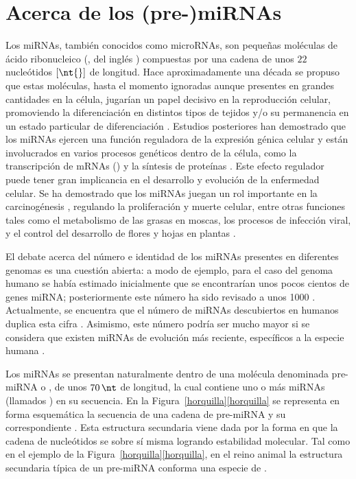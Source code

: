 %
%
%
\section{Acerca de los (pre-)miRNAs}
%
Los miRNAs, también conocidos como microRNAs, son pequeñas moléculas
de ácido ribonucleico (, del inglés )
compuestas por una cadena de unos $22$ nucleótidos $[\nt{}]$ de
longitud.
Hace aproximadamente una década se propuso que estas moléculas, hasta
el momento ignoradas aunque presentes en grandes cantidades en la
célula, jugarían un papel decisivo en la reproducción celular,
promoviendo la diferenciación en distintos tipos de tejidos y/o su
permanencia en un estado particular de diferenciación
\cite{lee-mammal}.
Estudios posteriores han demostrado que los miRNAs ejercen una función
reguladora de la expresión génica celular \cite{bartel116} y están
involucrados en varios procesos genéticos dentro de la célula, como la
transcripción de mRNAs () y la síntesis de proteínas
\cite{lili}.
Este efecto regulador puede tener gran implicancia en el desarrollo y
evolución de la enfermedad celular.
Se ha demostrado que los miRNAs juegan un rol importante en la
carcinogénesis \cite{aurora,lili}, regulando la proliferación y muerte
celular, entre otras funciones tales como el metabolismo de las grasas
en moscas, los procesos de infección viral, y el control del
desarrollo de flores y hojas en plantas \cite{bartel116,lecellier}.

El debate acerca del número e identidad de los miRNAs presentes en
diferentes genomas es una cuestión abierta: a modo de ejemplo, para el
caso del genoma humano se había estimado inicialmente que se
encontrarían unos pocos cientos de genes miRNA; posteriormente este
número ha sido revisado a unos 1000 \cite{sewer,chang}.
Actualmente, se encuentra que el número de miRNAs descubiertos en
humanos duplica esta cifra \cite{gomes}.
Asimismo, este número podría ser mucho mayor si se considera que
existen miRNAs de evolución más reciente, específicos a la especie
humana \cite{sewer}.

Los miRNAs se presentan naturalmente dentro de una molécula denominada
pre-miRNA o , de unos $70\,\nt$ de longitud, la
cual contiene uno o más miRNAs (llamados ) en su secuencia.
En la \iflatexml{}Figura~\ref{horquilla}\else\autoref{horquilla}\fi{}
se representa en forma esquemática la secuencia de una cadena de
pre-miRNA y su correspondiente .
Esta estructura secundaria viene dada por la forma en que la cadena de
nucleótidos se  sobre sí misma logrando estabilidad
molecular.
Tal como en el ejemplo de la
\iflatexml{}Figura~\ref{horquilla}\else\autoref{horquilla}\fi, en el
reino animal la estructura secundaria típica de un pre-miRNA conforma
una especie de  \cite{bartel116,sewer}.
